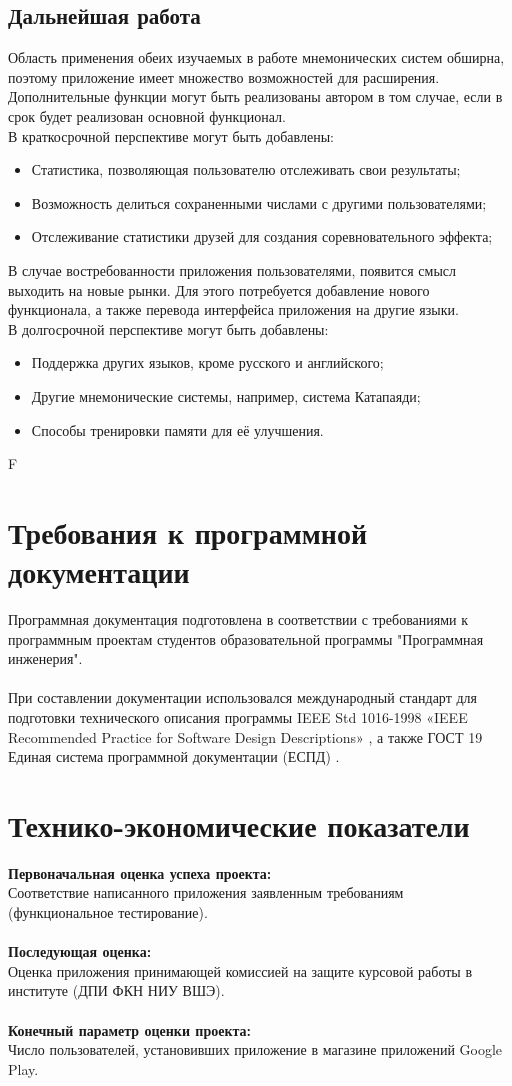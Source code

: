 \documentclass[draft]{article}
\begin{document}
\subsection{Дальнейшая работа}
Область применения обеих изучаемых в работе мнемонических систем обширна, поэтому приложение имеет множество возможностей для расширения. Дополнительные функции могут быть реализованы автором в том случае, если в срок будет реализован основной функционал.\\
В краткосрочной перспективе могут быть добавлены:
\begin{itemize}
\item Статистика, позволяющая пользователю отслеживать свои результаты;
\item Возможность делиться сохраненными числами с другими пользователями;
\item Отслеживание статистики друзей для создания соревновательного эффекта;
\end{itemize}
В случае востребованности приложения пользователями, появится смысл выходить на новые рынки. Для этого потребуется добавление нового функционала, а также перевода интерфейса приложения на другие языки.\\
В долгосрочной перспективе могут быть добавлены: 
\begin{itemize}
\item Поддержка других языков, кроме русского и английского;
\item Другие мнемонические системы, например, система Катапаяди;
\item Способы тренировки памяти для её улучшения.
\end{itemize}F
\newpage
\section {Требования к программной документации}
Программная документация подготовлена в соответствии с требованиями к программным проектам студентов образовательной программы "{}Программная инженерия"{}.\\
~\\
При составлении документации использовался международный стандарт для подготовки технического описания программы IEEE Std 1016-1998 «IEEE Recommended Practice for Software Design Descriptions» \cite{litlink12}, а также ГОСТ 19 Единая система программной документации (ЕСПД) \cite{litlink13}.
\newpage
\section {Технико-экономические показатели}
\textbf{Первоначальная оценка успеха проекта:}\\
Соответствие написанного приложения заявленным требованиям (функциональное тестирование).\\
~\\
\textbf{Последующая оценка:}\\
Оценка приложения принимающей комиссией на защите курсовой работы в институте (ДПИ ФКН НИУ ВШЭ).\\
~\\
\textbf{Конечный параметр оценки проекта:}\\
Число пользователей, установивших приложение в магазине приложений Google Play.\\
\newpage
\end{document}
